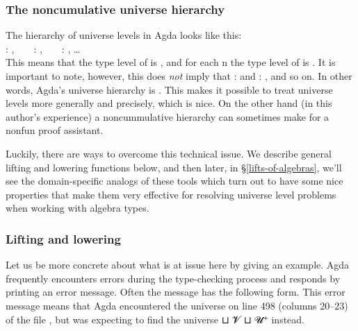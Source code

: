 \subsubsection{The noncumulative universe hierarchy}\label{the-noncumulative-hierarchy}

The hierarchy of universe levels in Agda looks like this:\\[-4pt]

 \as :  , ~ ~  \as :  , ~ ~  \as :  , \ldots{}\\[4pt]
This means that the type level of  is , and for each \ab n the type level of  is .
It is important to note, however, this does \emph{not} imply that  \as :  and  \as : , and so on. In other words, Agda's universe hierarchy is . This makes it possible to treat universe levels more generally and precisely, which is nice. On the other hand (in this author's experience) a noncummulative hierarchy can sometimes make for a nonfun proof assistant.

Luckily, there are ways to overcome this technical issue. We describe general lifting and lowering functions below, and then later, in \S\ref{lifts-of-algebras},
we'll see the domain-specific analogs of these tools which turn out to have some nice properties that make them very effective for resolving universe level problems when working with algebra types.

\subsubsection{Lifting and lowering}\label{lifting-and-lowering}

Let us be more concrete about what is at issue here by giving an example. Agda frequently encounters errors during the type-checking process and responds by printing an error message. Often the message has the following form.
{\color{red}{\small
\begin{verbatim}
  Algebras.lagda:498,20-23 𝓤 != 𝓞 ⊔ 𝓥 ⊔ 𝓤 ⁺ when checking that... has type...
\end{verbatim}}}
\noindent This error message means that Agda encountered the universe  on line 498 (columns 20--23) of the file , but was expecting to find the universe  \aop ⊔ \ab 𝓥 \aop ⊔ \ab 𝓤\af ⁺ instead.

